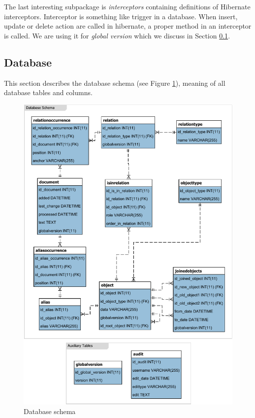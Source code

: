 
The last interesting subpackage is \emph{interceptors} containing definitions
of Hibernate interceptors. Interceptor is something like trigger in a database.
When insert, update or delete action are called in hibernate, a proper method
in an interceptor is called. We are using it for \emph{global version} which we
discuss in Section \ref{sec:Database}.

\subsection{Database}
\label{sec:Database}

This section describes the database schema (see Figure \ref{fig:DatabaseSchema}), meaning of all database tables and columns.

\begin{figure}[!hp]
        \centering
        \includegraphics{Images/DatabaseSchema}
        \caption{Database schema}
        \label{fig:DatabaseSchema}
\end{figure}

